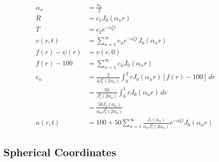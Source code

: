 \documentclass{article}
\begin{document}
\begin{align*}
  \alpha_n                                                                      & = \frac{x_n}{2}                                                                                                   \\
  R                                                                             & = c_1 J_0(\alpha_n r)                                                                                             \\
  T                                                                             & = c_2 e^{-\alpha_n^2 t}                                                                                           \\
  v(r, t)                                                                       & = \sum_{n = 1}^\infty c_n e^{-\alpha_n^2 t} J_0(\alpha_n r)                                                       \\
  f(r) - \psi(r)                                                                & = v(r, 0)                                                                                                         \\
  f(r) - 100                                                                    & = \sum_{n = 1}^\infty c_n J_0(\alpha_n r)                                                                         \\
  c_n                                                                           & = \frac{2}{4 J_1^2(2 \alpha_n)} \int_0^2 r J_0(\alpha_n r) [f(r) - 100] \,d r                                     \\
                                                                                & = \frac{50}{J_1^2(2 \alpha_n)} \int_0^1 r J_0(\alpha_n r) \,d r                                                   \\
                                                                                & = \frac{50 J_1(\alpha_n)}{\alpha_n J_1^2(2 \alpha_n)}                                                             \\
  u(r, t)                                                                       & = 100 + 50 \sum_{n = 1}^\infty \frac{J_1(\alpha_n)}{\alpha_n J_1^2(2 \alpha_n)} e^{-\alpha_n^2 t} J_0(\alpha_n r)
\end{align*}

\subsection{Spherical Coordinates}
\end{document}
